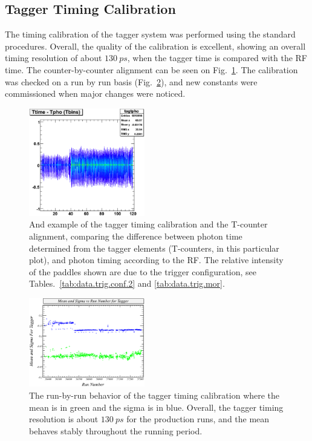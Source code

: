 \subsection{\label{sec:calib.tag}Tagger Timing Calibration}
The timing calibration of the tagger system was performed using the standard procedures. Overall, the quality of the calibration is excellent, showing an overall timing resolution of about $130~ps$, when the tagger time is compared with the RF time. The counter-by-counter alignment can be seen on Fig.~\ref{tagtpho}. The calibration was checked on a run by run basis (Fig.~\ref{tagRun}), and new constants were commissioned when major changes were noticed.

\begin{figure}[htpb]
\begin{center}
 \includegraphics[width=0.45\textwidth]{figures/calib/tag/timing/tagtpho.eps}
  \caption{And example of the tagger timing calibration and the T-counter alignment, comparing  the difference between photon time determined from the tagger elements (T-counters, in this particular plot), and photon timing according to the RF. The relative intensity of the paddles shown are due to the trigger configuration, see Tables.~\ref{tab:data.trig.conf.2} and \ref{tab:data.trig.mor}.}
  \label{tagtpho}
  \end{center}
\end{figure}


\begin{figure}[htpb]
\begin{center}
 \includegraphics[width=0.45\textwidth]{figures/calib/tag/timing/tagRun.eps}
  \caption{The run-by-run behavior of the tagger timing calibration where the mean is in green and the sigma is in blue. Overall, the tagger timing resolution is about $130~ps$ for the production runs, and the mean behaves stably throughout the running period.}
  \label{tagRun}
  \end{center}
\end{figure}
